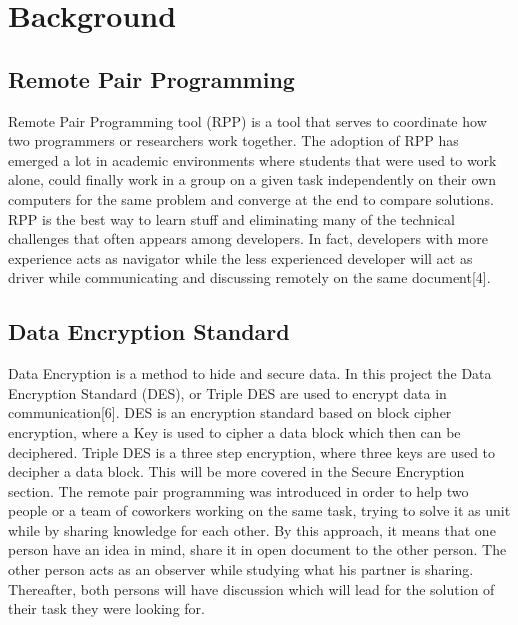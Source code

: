 \section{Background}

\subsection{Remote Pair Programming}

Remote Pair Programming tool (RPP) is a tool that serves  to coordinate how two programmers or researchers work together. The  adoption of RPP has emerged a lot  in academic environments where students that  were used to work alone, could finally work in a group on a given task  independently on their own computers for the same problem and converge at the end to compare solutions.  RPP is the best way to learn stuff and eliminating many of the technical challenges that often appears among developers. In fact, developers with more experience acts as navigator while the less experienced developer will act as driver while communicating and discussing remotely on the same document[4]. 

\subsection{Data Encryption Standard}

Data Encryption is a method to hide and secure data. In this project the Data Encryption Standard (DES), or Triple DES are used to encrypt data in communication[6]. DES is an encryption standard based on block cipher encryption, where a Key is used to cipher a data block which then can be deciphered. Triple DES is a three step encryption, where three keys are used to decipher a data block. This will be more covered in the Secure Encryption section. 
The remote pair programming was introduced in order to help two people or a team of coworkers working on the same task, trying to solve it as unit while  by sharing knowledge for each other. By this approach, it means that one person have an idea in mind, share it in open document to the other person. The other person acts as an observer while studying what his partner is sharing. Thereafter, both persons will have discussion which will lead for the solution of their task they were looking for. 
